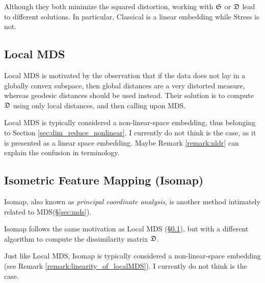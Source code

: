 \begin{remark}
Although they both minimize the squared distortion, working with $\mathfrak{S}$ or $\mathfrak{D}$ lead to different solutions. 
In particular, Classical is a linear embedding while Stress is not. 
\end{remark}




\subsection{Local MDS}
\label{sec:localMDS}
Local MDS is motivated by the observation that if the data does not lay in a globally convex subspace, then global distances are a very distorted measure, whereas geodesic distances should be used instead. 
Their solution is to compute $\mathfrak{D}$ using only local distances, and then calling upon MDS.

\begin{remark}
\label{remark:linearity_of_localMDS}
Local MDS is typically considered a non-linear-space embedding, thus belonging to Section \ref{sec:dim_reduce_nonlinear}.
I currently do not think is the case, as it is presented as a linear space embedding.
Maybe Remark \ref{remark:nldr} can explain the confusion in terminology.
\end{remark}



\subsection{Isometric Feature Mapping (Isomap)}
\label{sec:isomap}

Isomap, also known as \emph{principal coordinate analysis}, is another method intimately related to MDS(\S\ref{sec:mds}).

Isomap follows the same motivation as Local MDS (\S\ref{sec:localMDS}), but with a different algorithm to compute the dissimilarity matrix $\mathfrak{D}$.

\begin{remark}
Just like Local MDS, Isomap is typically considered a non-linear-space embedding (see Remark \ref{remark:linearity_of_localMDS}).
I currently do not think is the case.
\end{remark}









